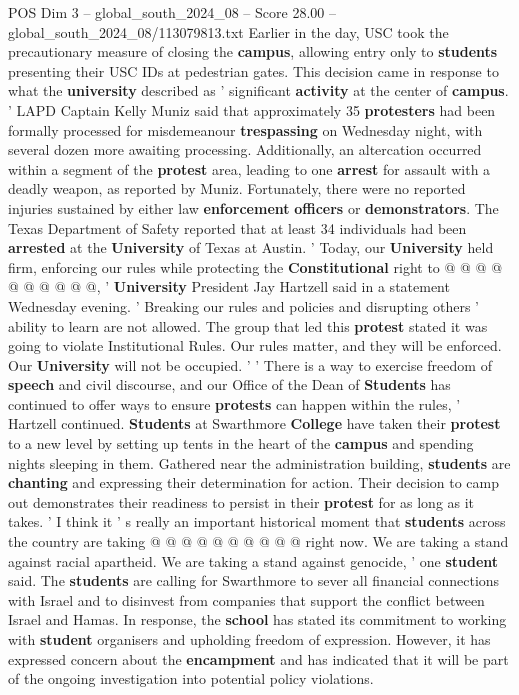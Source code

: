 \begin{textsample}{POS Dim 3 – global\_south\_2024\_08 – Score 28.00 – global\_south\_2024\_08/113079813.txt}
Earlier in the day, USC took the precautionary measure of closing the \textbf{campus}, allowing entry only to \textbf{students} presenting their USC IDs at pedestrian gates.
This decision came in response to what the \textbf{university} described as ' significant \textbf{activity} at the center of \textbf{campus}. ' LAPD Captain Kelly Muniz said that approximately 35 \textbf{protesters} had been formally processed for misdemeanour \textbf{trespassing} on Wednesday night, with several dozen more awaiting processing.
Additionally, an altercation occurred within a segment of the \textbf{protest} area, leading to one \textbf{arrest} for assault with a deadly weapon, as reported by Muniz.
Fortunately, there were no reported injuries sustained by either law \textbf{enforcement} \textbf{officers} or \textbf{demonstrators}.
The Texas Department of Safety reported that at least 34 individuals had been \textbf{arrested} at the \textbf{University} of Texas at Austin. ' Today, our \textbf{University} held firm, enforcing our rules while protecting the \textbf{Constitutional} right to @ @ @ @ @ @ @ @ @ @, ' \textbf{University} President Jay Hartzell said in a statement Wednesday evening. ' Breaking our rules and policies and disrupting others ' ability to learn are not allowed.
The group that led this \textbf{protest} stated it was going to violate Institutional Rules.
Our rules matter, and they will be enforced.
Our \textbf{University} will not be occupied. ' ' There is a way to exercise freedom of \textbf{speech} and civil discourse, and our Office of the Dean of \textbf{Students} has continued to offer ways to ensure \textbf{protests} can happen within the rules, ' Hartzell continued. \textbf{Students} at Swarthmore \textbf{College} have taken their \textbf{protest} to a new level by setting up tents in the heart of the \textbf{campus} and spending nights sleeping in them.
Gathered near the administration building, \textbf{students} are \textbf{chanting} and expressing their determination for action.
Their decision to camp out demonstrates their readiness to persist in their \textbf{protest} for as long as it takes. ' I think it ' s really an important historical moment that \textbf{students} across the country are taking @ @ @ @ @ @ @ @ @ @ right now.
We are taking a stand against racial apartheid.
We are taking a stand against genocide, ' one \textbf{student} said.
The \textbf{students} are calling for Swarthmore to sever all financial connections with Israel and to disinvest from companies that support the conflict between Israel and Hamas.
In response, the \textbf{school} has stated its commitment to working with \textbf{student} organisers and upholding freedom of expression.
However, it has expressed concern about the \textbf{encampment} and has indicated that it will be part of the ongoing investigation into potential policy violations.

\end{textsample}
